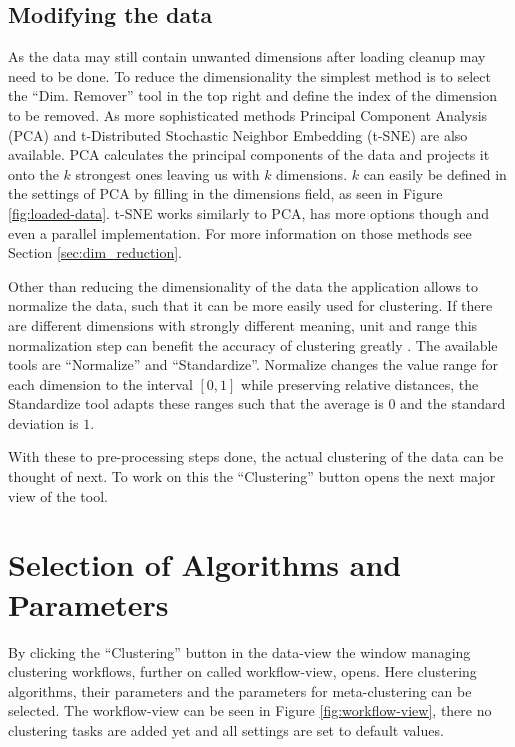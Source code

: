 \documentclass[
	a4paper,
	english,
	twoside,
	openright,               
	11pt                            
	]{report}
\begin{document}
\subsection{Modifying the data}

As the data may still contain unwanted dimensions after loading cleanup may need to be done. To reduce the dimensionality the simplest method is to select the ``Dim. Remover'' tool in the top right and define the index of the dimension to be removed. As more sophisticated methods Principal Component Analysis (PCA) \cite{pca} and t-Distributed Stochastic Neighbor Embedding (t-SNE) \cite{Maaten2008VisualizingDU} are also available. PCA calculates the principal components of the data and projects it onto the $k$ strongest ones leaving us with $k$ dimensions. $k$ can easily be defined in the settings of PCA by filling in the dimensions field, as seen in Figure \ref{fig:loaded-data}. t-SNE works similarly to PCA, has more options though and even a parallel implementation. For more information on those methods see Section \ref{sec:dim_reduction}.

Other than reducing the dimensionality of the data the application allows to normalize the data, such that it can be more easily used for clustering. If there are different dimensions with strongly different meaning, unit and range this normalization step can benefit the accuracy of clustering greatly \cite{normalization}. The available tools are ``Normalize'' and ``Standardize''. Normalize changes the value range for each dimension to the interval $[0,1]$ while preserving relative distances, the Standardize tool adapts these ranges such that the average is $0$ and the standard deviation is $1$.

With these to pre-processing steps done, the actual clustering of the data can be thought of next. To work on this the ``Clustering'' button opens the next major view of the tool.

\section{Selection of Algorithms and Parameters}\label{sec:sel_alg_param}
By clicking the ``Clustering'' button in the data-view the window managing clustering workflows, further on called workflow-view, opens. Here clustering algorithms, their parameters and the parameters for meta-clustering can be selected. The workflow-view can be seen in Figure \ref{fig:workflow-view}, there no clustering tasks are added yet and all settings are set to default values.
\end{document}
